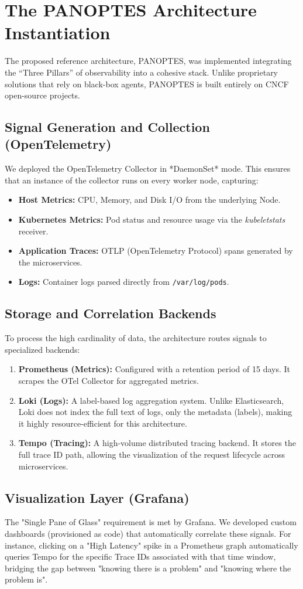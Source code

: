 \section{The PANOPTES Architecture Instantiation}
\label{sec:panoptes-instantiation}

The proposed reference architecture, PANOPTES, was implemented integrating the ``Three Pillars'' of observability into a cohesive stack. Unlike proprietary solutions that rely on black-box agents, PANOPTES is built entirely on CNCF open-source projects.

\subsection{Signal Generation and Collection (OpenTelemetry)}
We deployed the OpenTelemetry Collector in *DaemonSet* mode. This ensures that an instance of the collector runs on every worker node, capturing:
\begin{itemize}
    \item \textbf{Host Metrics:} CPU, Memory, and Disk I/O from the underlying Node.
    \item \textbf{Kubernetes Metrics:} Pod status and resource usage via the \textit{kubeletstats} receiver.
    \item \textbf{Application Traces:} OTLP (OpenTelemetry Protocol) spans generated by the microservices.
    \item \textbf{Logs:} Container logs parsed directly from \texttt{/var/log/pods}.
\end{itemize}

\subsection{Storage and Correlation Backends}
To process the high cardinality of data, the architecture routes signals to specialized backends:
\begin{enumerate}
    \item \textbf{Prometheus (Metrics):} Configured with a retention period of 15 days. It scrapes the OTel Collector for aggregated metrics.
    \item \textbf{Loki (Logs):} A label-based log aggregation system. Unlike Elasticsearch, Loki does not index the full text of logs, only the metadata (labels), making it highly resource-efficient for this architecture.
    \item \textbf{Tempo (Tracing):} A high-volume distributed tracing backend. It stores the full trace ID path, allowing the visualization of the request lifecycle across microservices.
\end{enumerate}

\subsection{Visualization Layer (Grafana)}
The "Single Pane of Glass" requirement is met by Grafana. We developed custom dashboards (provisioned as code) that automatically correlate these signals. For instance, clicking on a "High Latency" spike in a Prometheus graph automatically queries Tempo for the specific Trace IDs associated with that time window, bridging the gap between "knowing there is a problem" and "knowing where the problem is".